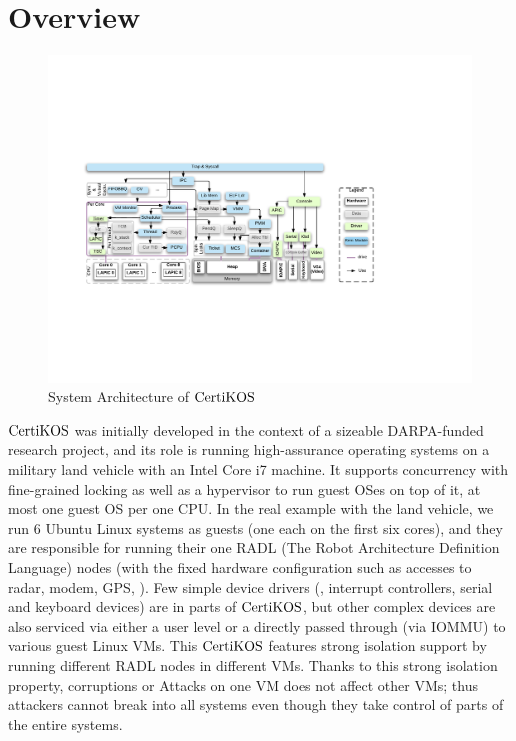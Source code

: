 \section{Overview}
\label{chapter:certikos:sec:overview}

\begin{figure}
\includegraphics[width=\textwidth]{figs/certikos/sysarch}
\caption{System Architecture of $\mathrm{CertiKOS}$}
\label{fig:chapter:certikos:system-architecture-of-certikos}
\end{figure}

$\mathrm{CertiKOS}$ was initially developed in the context of a sizeable DARPA-funded research project,
and its role is running high-assurance operating systems on a military land vehicle with an Intel Core i7 machine. 
It supports concurrency with fine-grained locking as well as a hypervisor
to run guest OSes on top of it, 
at most one guest OS per one CPU. 
In the real example with the land vehicle, 
we run 6 Ubuntu Linux systems as guests (one each on the first six cores), 
and  they are responsible for running  their one RADL (The Robot Architecture Definition Language) nodes (with the fixed hardware configuration such as accesses to radar, modem, GPS, \etc). 
Few simple device drivers (\eg, interrupt controllers, serial and keyboard devices)  are in parts of $\mathrm{CertiKOS}$,
but other complex devices are also serviced via either a user level or a directly passed through (via IOMMU) to various guest Linux VMs. 
This $\mathrm{CertiKOS}$ features strong isolation support by running different RADL nodes in different VMs. 
Thanks to this strong isolation property, corruptions or Attacks on one VM does not affect other VMs; 
thus attackers cannot break into all systems even though they take control of parts of the entire systems.

